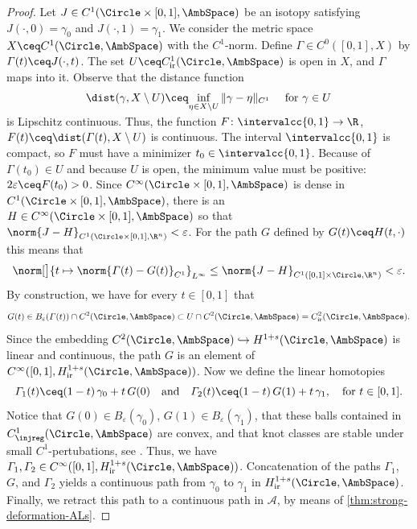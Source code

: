 \begin{proof}
Let $J \in C^1(\Circle\times[0,1] ,\AmbSpace)$ be an isotopy satisfying $J(\cdot,0) = \gamma_0$ and $J(\cdot,1) = \gamma_1$. 
We consider the metric space $X \ceq C^1(\Circle,\AmbSpace)$ with the $C^1$-norm.
Define $\varGamma \in C^0([0,1],X)$ by $\varGamma(t) \ceq J(\cdot,t)$.
The set $U \ceq C^1_{\mathrm{ir}}(\Circle,\AmbSpace)$ is open in $X$,
and $\varGamma$ maps into it.
Observe that the distance function
\[
    \dist(\gamma, X \setminus U) \ceq \smash{\inf_{\eta \in X \setminus U} \|\gamma - \eta\|_{C^1}} \quad \text{ for }\gamma\in U
\]
is Lipschitz continuous.
Thus, the function $F \colon \intervalcc{0,1} \to \R$, $F(t) \ceq \dist(\varGamma(t), X \setminus U)$ is continuous. 
The interval $\intervalcc{0,1}$ is compact, so $F$ must have a minimizer $t_0 \in \intervalcc{0,1}$.
Because of $\varGamma(t_0) \in U$ and because $U$ is open, the minimum value must be positive: $2\varepsilon\ceq F(t_0) > 0$. 
Since $C^\infty(\Circle\times[0,1],\AmbSpace)$ is dense in $C^1(\Circle\times[0,1],\AmbSpace)$, there is an  $H \in C^\infty(\Circle\times[0,1],\AmbSpace)$ so that
$
    \norm{J - H}_{C^1(\Circle\times[0,1],\R^n)}
    <
    \varepsilon
$.
For the path $G$ defined by $G(t) \ceq H(t,\cdot)$ this means that
\[
\norm[\big]{ 
		t \mapsto \norm{ \varGamma(t) - G(t) }_{C^1} 
	}_{L^\infty} 
    \leq 
    \norm{J - H}_{C^1([0,1] \times \Circle,\R^n)}
    <
    \varepsilon
	.
\]
By construction, we have for every $t \in [0,1]$ that
\[
    G(t) 
	\in 
	B_\varepsilon(\varGamma(t)) \cap C^2(\Circle,\AmbSpace)
	\subset
	U \cap C^2(\Circle,\AmbSpace) 
    = C^2_{\mathrm{ir}}(\Circle,\AmbSpace)
	.
\]
Since the embedding $C^2(\Circle,\AmbSpace) \hookrightarrow H^{1+s}(\Circle,\AmbSpace)$ is linear and continuous, the path $G$ is an element of
$C^\infty([0,1],H^{1+s}_{\mathrm{ir}}(\Circle,\AmbSpace))$.
Now we define the linear homotopies
\[
    \varGamma_1(t) \ceq (1-t) \, \gamma_0 + t \, G(0)
    \quad \text{and} \quad 
    \varGamma_2(t) \ceq (1-t) \, G(1) + t \, \gamma_1
    ,
    \quad 
    \text{for $t \in [0,1]$}
    .
\]
Notice that $G(0) \in B_\varepsilon(\gamma_0)$, $G(1) \in B_\varepsilon(\gamma_1)$, that these balls contained in $ C^1_{\injreg}(\Circle,\AmbSpace) $ are convex,  and that knot classes are stable under small $ C^1 $-pertubations, see \cite{blatt_2009a}. 
Thus, we have $\varGamma_1, \varGamma_2 \in C^\infty([0,1],H^{1+s}_{\mathrm{ir}}(\Circle,\AmbSpace))$.
Concatenation of the paths $\varGamma_1$, $G$, and $\varGamma_2$ yields a continuous path from $\gamma_0$ to $\gamma_1$ in $H^{1+s}_{\mathrm{ir}}(\Circle,\AmbSpace)$.
Finally, we retract this path to a continuous path in $\mathcal{A}$, by means of \cref{thm:strong-deformation-ALs}.
\end{proof}

